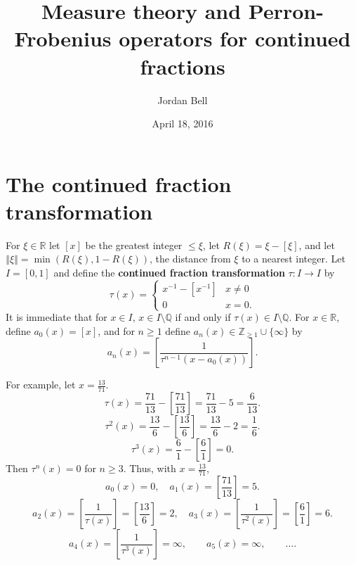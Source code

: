 \documentclass{article}
\newcommand{\norm}[1]{\left\Vert #1 \right\Vert}
\theoremstyle{definition}
\theoremstyle{definition}
\begin{document}
\title{Measure theory and Perron-Frobenius operators for continued fractions}
\author{Jordan Bell}
\date{April 18, 2016}

\maketitle


\section{The continued fraction transformation}
For $\xi \in \mathbb{R}$ let $[x]$ be the greatest integer $\leq \xi$, let $R(\xi)=\xi-[\xi]$, and let $\norm{\xi} = \min(R(\xi),1-R(\xi))$, the distance from $\xi$ to a nearest integer.
Let $I=[0,1]$ and define the \textbf{continued fraction transformation} $\tau:I \to I$ by
\[
\tau(x)=\begin{cases}
x^{-1}-[x^{-1}]&x \neq 0\\
0&x=0.
\end{cases}
\]
It is immediate that for $x \in I$, $x \in I \setminus \mathbb{Q}$ if and only if $\tau(x) \in I \setminus \mathbb{Q}$.
For $x \in \mathbb{R}$,
define $a_0(x) = [x]$, and for $n \geq 1$ define $a_n(x) \in \mathbb{Z}_{\geq 1} \cup \{\infty\}$ by
\[
a_n(x) = \left[ \frac{1}{\tau^{n-1}(x-a_0(x))} \right].
\]

For example, let $x=\frac{13}{71}$.
\[
\tau(x) = \frac{71}{13} - \left[\frac{71}{13} \right] = \frac{71}{13} - 5 = \frac{6}{13}.
\]
\[
\tau^2(x) = \frac{13}{6} - \left[\frac{13}{6}\right] = \frac{13}{6}-2= \frac{1}{6}.
\]
\[
\tau^3(x) = \frac{6}{1}-\left[\frac{6}{1}\right] = 0.
\]
Then $\tau^n(x)=0$ for $n \geq 3$. Thus, with $x=\frac{13}{71}$,
\[
a_0(x)=0,\quad a_1(x) =  \left[\frac{71}{13} \right] = 5.
\]
\[
a_2(x) = \left[\frac{1}{\tau(x)}\right] = \left[\frac{13}{6}\right]=2,\quad
a_3(x) = \left[\frac{1}{\tau^2(x)} \right] = \left[\frac{6}{1}\right]=6.
\]
\[
a_4(x)=\left[\frac{1}{\tau^3(x)}\right] = \infty, \qquad a_5(x) = \infty, \qquad \ldots.
\]
\end{document}
